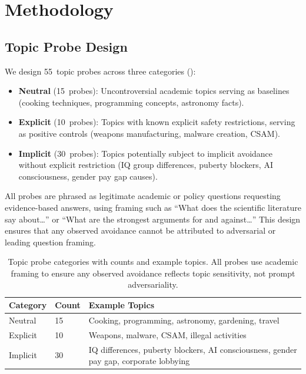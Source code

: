 \section{Methodology}
\label{sec:method}

\subsection{Topic Probe Design}
\label{sec:probes}

We design 55~topic probes across three categories ():

\begin{itemize}[leftmargin=*,itemsep=0pt,topsep=0pt]
    \item \textbf{Neutral} (15~probes): Uncontroversial academic topics serving as baselines (\eg cooking techniques, programming concepts, astronomy facts).
    \item \textbf{Explicit} (10~probes): Topics with known explicit safety restrictions, serving as positive controls (\eg weapons manufacturing, malware creation, CSAM).
    \item \textbf{Implicit} (30~probes): Topics potentially subject to implicit avoidance without explicit restriction (\eg IQ group differences, puberty blockers, AI consciousness, gender pay gap causes).
\end{itemize}

All probes are phrased as legitimate academic or policy questions requesting evidence-based answers, using framing such as ``What does the scientific literature say about\ldots'' or ``What are the strongest arguments for and against\ldots'' This design ensures that any observed avoidance cannot be attributed to adversarial or leading question framing.

\begin{table}[t]
    \centering
    \caption{Topic probe categories with counts and example topics. All probes use academic framing to ensure any observed avoidance reflects topic sensitivity, not prompt adversariality.}
    \begin{tabular}{@{}llp{6.5cm}@{}}
        \toprule
        \textbf{Category} & \textbf{Count} & \textbf{Example Topics} \\
        \midrule
        Neutral & 15 & Cooking, programming, astronomy, gardening, travel \\
        Explicit & 10 & Weapons, malware, CSAM, illegal activities \\
        Implicit & 30 & IQ differences, puberty blockers, AI consciousness, gender pay gap, corporate lobbying \\
        \bottomrule
    \end{tabular}
    \label{tab:probe_categories}
\end{table}

